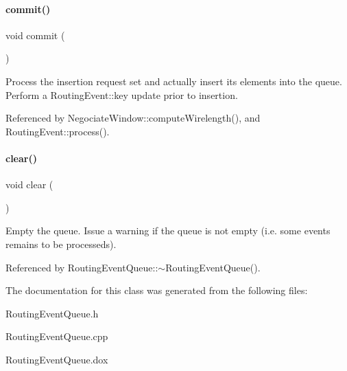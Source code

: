 \paragraph{\texorpdfstring{commit()}{commit()}}
{\footnotesize\ttfamily void commit (\begin{DoxyParamCaption}{ }\end{DoxyParamCaption})}

Process the insertion request set and actually insert it\textquotesingle{}s elements into the queue. Perform a Routing\+Event\+::key update prior to insertion. 

Referenced by Negociate\+Window\+::compute\+Wirelength(), and Routing\+Event\+::process().

\mbox{\label{classKite_1_1RoutingEventQueue_ac8bb3912a3ce86b15842e79d0b421204}} 
\paragraph{\texorpdfstring{clear()}{clear()}}
{\footnotesize\ttfamily void clear (\begin{DoxyParamCaption}{ }\end{DoxyParamCaption})}

Empty the queue. Issue a warning if the queue is not empty (i.\+e. some events remains to be processeds). 

Referenced by Routing\+Event\+Queue\+::$\sim$\+Routing\+Event\+Queue().



The documentation for this class was generated from the following files\+:\begin{DoxyCompactItemize}
\item 
Routing\+Event\+Queue.\+h\item 
Routing\+Event\+Queue.\+cpp\item 
Routing\+Event\+Queue.\+dox\end{DoxyCompactItemize}
